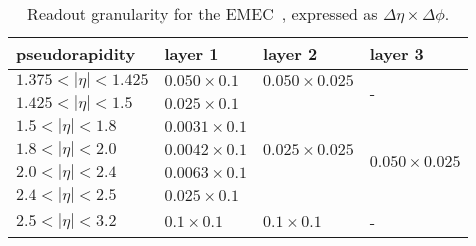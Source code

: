 \begin{table}[!htbp]
\begin{center}
\begin{tabular}{|l|l|l|l|}
\hline
pseudorapidity & layer 1 & layer 2& layer 3\\
\hline
$1.375 < |\eta| < 1.425$ &  $0.050 \times 0.1$ & $0.050 \times 0.025$ & \multirow{2}{*}{-} \\
\cline{1-3}
$1.425 < |\eta| < 1.5$ & $0.025 \times 0.1$    & \multirow{5}{*}{$0.025 \times 0.025$} & \\
\cline{1-2} \cline{4-4}
$1.5 < |\eta| < 1.8$ &   $0.0031 \times 0.1$   & &\multirow{4}{*}{$0.050 \times 0.025$} \\
\cline{1-2}
$1.8 < |\eta| < 2.0$ &  $0.0042 \times 0.1$    & & \\
\cline{1-2}
$2.0 < |\eta| < 2.4$ &  $0.0063 \times 0.1$    & &\\
\cline{1-2}
$2.4 < |\eta| < 2.5$ &  $0.025 \times 0.1$     & &\\
\hline
$2.5 < |\eta| < 3.2$ &  $0.1 \times 0.1$       & $0.1 \times 0.1$ & - \\
\hline
\end{tabular}
\end{center}
\caption[Readout granularity for the EMEC]{Readout granularity for the EMEC~\cite{detector_paper}, expressed as $\Delta \eta \times \Delta \phi$.}
\label{table_gran_emec}
\end{table}




%
%









